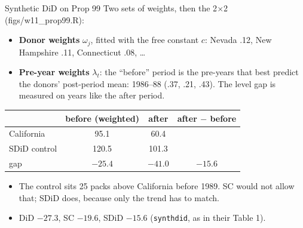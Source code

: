 \documentclass[aspectratio=169,11pt,xcolor=dvipsnames]{beamer}
\newcommand{\srcp}[1]{{\scriptsize\color{gray}(#1)}}
\begin{document}
\begin{frame}{Synthetic DiD on Prop 99}
Two sets of weights, then the 2$\times$2 \srcp{figs/w11\_prop99.R}:
\begin{itemize}\itemsep2pt
  \item \textbf{Donor weights} $\omega_j$, fitted with the free constant $c$:
        Nevada .12, New Hampshire .11, Connecticut .08, \dots
  \item \textbf{Pre-year weights} $\lambda_t$: the ``before'' period is the
        pre-years that best predict the donors' post-period mean: 1986--88
        (.37, .21, .43). The level gap is measured on years like the after period.
\end{itemize}
\vskip3pt
\begin{center}\small
\renewcommand{\arraystretch}{1.1}
\begin{tabular}{@{}lccc@{}}
\toprule
 & before (weighted) & after & after $-$ before \\
\midrule
California & 95.1 & 60.4 & \\
SDiD control & 120.5 & 101.3 & \\
gap & $-25.4$ & $-41.0$ & $\mathbf{-15.6}$ \\
\bottomrule
\end{tabular}
\end{center}
\begin{itemize}\itemsep2pt
  \item The control sits 25 packs above California before 1989. SC would not
        allow that; SDiD does, because only the trend has to match.
  \item DiD $-27.3$, SC $-19.6$, SDiD $-15.6$ (\texttt{synthdid}, as in their Table 1).
\end{itemize}
\end{frame}
\end{document}
